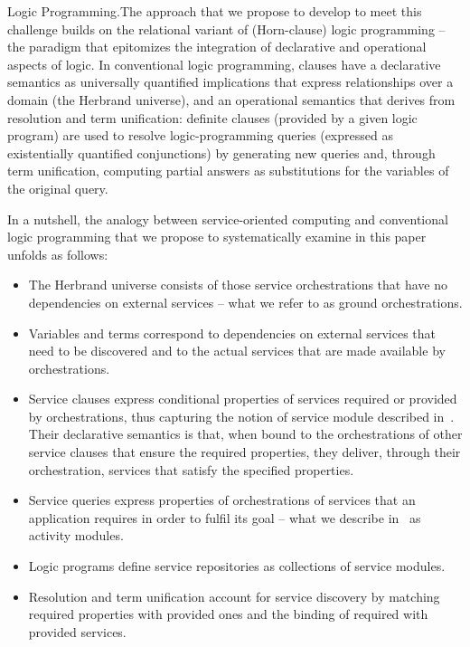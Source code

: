 \documentclass{LMCS}
\begin{document}
\begin{minisection}{Logic Programming.}The approach that we propose to develop to meet this challenge builds on the relational variant of (Horn-clause) logic programming -- the paradigm that epitomizes the integration of declarative and operational aspects of logic.  In conventional logic programming, clauses have a declarative semantics as universally quantified implications that express relationships over a domain (the Herbrand universe), and an operational semantics that derives from resolution and term unification: definite clauses (provided by a given logic program) are used to resolve logic-programming queries (expressed as existentially quantified conjunctions) by generating new queries and, through term unification, computing partial answers as substitutions for the variables of the original query. 

  In a nutshell, the analogy between service-oriented computing and conventional logic programming that we propose to systematically examine in this paper unfolds as follows:
  \begin{itemize}

  \item The Herbrand universe consists of those service orchestrations that have no dependencies on external services -- what we refer to as ground orchestrations.
    
  \item Variables and terms correspond to dependencies on external services that need to be discovered and to the actual services that are made available by orchestrations.

  \item Service clauses express conditional properties of services required or provided by orchestrations, thus capturing the notion of service module described in~\cite{Fiadeiro-Lopes-Bocchi:An-abstract-model-for-service-discovery-and-binding-2011}.  Their declarative semantics is that, when bound to the orchestrations of other service clauses that ensure the required properties, they deliver, through their orchestration, services that satisfy the specified properties.

  \item Service queries express properties of orchestrations of services that an application requires in order to fulfil its goal -- what we describe in~\cite{Fiadeiro-Lopes-Bocchi:An-abstract-model-for-service-discovery-and-binding-2011} as activity modules.

  \item Logic programs define service repositories as collections of service modules.

  \item Resolution and term unification account for service discovery by matching required properties with provided ones and the binding of required with provided services.

  \end{itemize}
\end{minisection}
\end{document}
